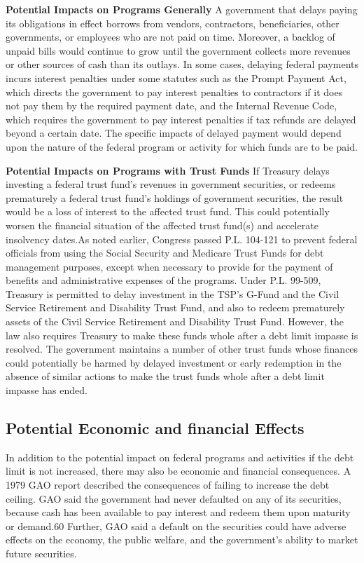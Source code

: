 \nextline
\textbf{Potential Impacts on Programs Generally}
A government that delays paying its obligations in effect borrows from vendors, contractors, beneficiaries, other governments, or employees who are not paid on time. Moreover, a backlog of unpaid bills would continue to grow until the government collects more revenues or other sources of cash than its outlays. In some cases, delaying federal payments incurs interest penalties under some statutes such as the Prompt Payment Act, which directs the government to pay interest penalties to contractors if it does not pay them by the required payment date, and the Internal Revenue Code, which requires the government to pay interest penalties if tax refunds are delayed beyond a certain date. The specific impacts of delayed payment would depend upon the nature of the federal program or activity for which funds are to be paid.

\nextline
\textbf{Potential Impacts on Programs with Trust Funds}
If Treasury delays investing a federal trust fund’s revenues in government securities, or redeems prematurely a federal trust fund’s holdings of government securities, the result would be a loss of interest to the affected trust fund. This could potentially worsen the financial situation of the affected trust fund(s) and accelerate insolvency dates.As noted earlier, Congress passed P.L. 104-121 to prevent federal officials from using the Social Security and Medicare Trust Funds for debt management purposes, except when necessary to provide for the payment of benefits and administrative expenses of the programs. Under P.L. 99-509, Treasury is permitted to delay investment in the TSP’s G-Fund and the Civil Service Retirement and Disability Trust Fund, and also to redeem prematurely assets of the Civil Service Retirement and Disability Trust Fund. However, the law also requires Treasury to make these funds whole after a debt limit impasse is resolved. The government maintains a number of other trust funds whose finances could potentially be harmed by delayed investment or early redemption in the absence of similar actions to make the trust funds whole after a debt limit impasse has ended.

\subsection{Potential Economic and financial Effects}
In addition to the potential impact on federal programs and activities if the debt limit is not increased, there may also be economic and financial consequences. A 1979 GAO report described the consequences of failing to increase the debt ceiling. GAO said the government had never defaulted on any of its securities, because cash has been available to pay interest and redeem them upon maturity or demand.60 Further, GAO said a default on the securities could have adverse effects on the economy, the public welfare, and the government’s ability to market future securities.

